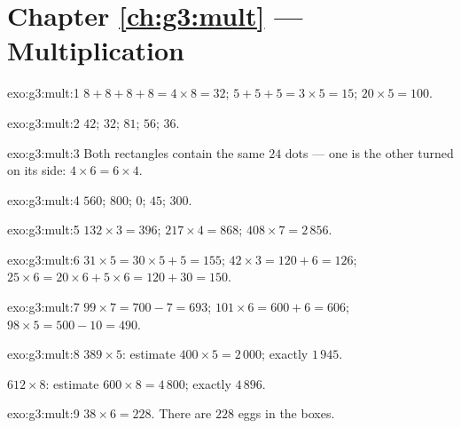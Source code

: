 \section*{Chapter \ref{ch:g3:mult} --- Multiplication}

\begin{solution}{exo:g3:mult:1}
$8 + 8 + 8 + 8 = 4 \times 8 = 32$; \quad
$5 + 5 + 5 = 3 \times 5 = 15$; \quad
$20 \times 5 = 100$.
\end{solution}

\begin{solution}{exo:g3:mult:2}
$42$; \quad $32$; \quad $81$; \quad $56$; \quad $36$.
\end{solution}

\begin{solution}{exo:g3:mult:3}
Both rectangles contain the same $24$ dots --- one is the other
turned on its side: $4 \times 6 = 6 \times 4$.
\end{solution}

\begin{solution}{exo:g3:mult:4}
$560$; \quad $800$; \quad $0$; \quad $45$; \quad $300$.
\end{solution}

\begin{solution}{exo:g3:mult:5}
$132 \times 3 = 396$; \quad
$217 \times 4 = 868$; \quad
$408 \times 7 = 2\,856$.
\end{solution}

\begin{solution}{exo:g3:mult:6}
$31 \times 5 = 30 \times 5 + 5 = 155$; \quad
$42 \times 3 = 120 + 6 = 126$; \quad
$25 \times 6 = 20 \times 6 + 5 \times 6 = 120 + 30 = 150$.
\end{solution}

\begin{solution}{exo:g3:mult:7}
$99 \times 7 = 700 - 7 = 693$; \quad
$101 \times 6 = 600 + 6 = 606$; \quad
$98 \times 5 = 500 - 10 = 490$.
\end{solution}

\begin{solution}{exo:g3:mult:8}
$389 \times 5$: estimate $400 \times 5 = 2\,000$; exactly
$1\,945$.

$612 \times 8$: estimate $600 \times 8 = 4\,800$; exactly $4\,896$.
\end{solution}

\begin{solution}{exo:g3:mult:9}
$38 \times 6 = 228$. There are $228$ eggs in the boxes.
\end{solution}

